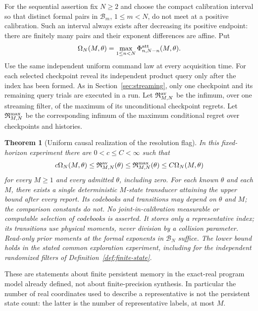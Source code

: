 \documentclass[11pt]{amsart}
\newtheorem{theorem}{Theorem}[section]
\theoremstyle{definition}\newtheorem{definition}[theorem]{Definition}
\theoremstyle{remark}\newtheorem{remark}[theorem]{Remark}
\begin{document}
For the sequential assertion fix $N\ge2$ and choose the compact
calibration interval so that distinct formal pairs in
$\mathcal B_m$, $1\le m<N$, do not meet at a positive calibration.
Such an interval always exists after decreasing its positive endpoint:
there are finitely many pairs and their exponent differences are affine.
Put
\begin{equation}\label{eq:general-stream-profile}
 \Omega_N(M,\theta)
   =\max_{1\le n<N}\Phi^{\rm att}_{n,N-n}(M,\theta).
\end{equation}
Use the same independent uniform command law at every acquisition time.
For each selected checkpoint reveal its independent product query only
after the index has been formed. As in Section~\ref{sec:streaming}, only
one checkpoint and its remaining query trials are executed in a run.
Let $\mathfrak R^{\rm av}_{M,N}$ be the infimum, over one streaming
filter, of the maximum of its unconditional checkpoint regrets. Let
$\mathfrak R^{\rm max}_{M,N}$ be the corresponding infimum of the
maximum conditional regret over checkpoints and histories.

\begin{theorem}[Uniform causal realization of the resolution flag]\label{thm:general-uniform-streaming}
In this fixed-horizon experiment there are $0<c\le C<\infty$ such that
\begin{equation}\label{eq:general-stream-law}
 c\Omega_N(M,\theta)\le\mathfrak R^{\rm av}_{M,N}(\theta)
 \le\mathfrak R^{\rm max}_{M,N}(\theta)
 \le C\Omega_N(M,\theta)
\end{equation}
for every $M\ge1$ and every admitted $\theta$, including zero. For each known $\theta$ and each $M$, there exists a
single deterministic $M$-state transducer attaining the upper bound after
every report. Its codebooks and transitions may depend on $\theta$ and
$M$; the comparison constants do not. No joint-in-calibration measurable
or computable selection of codebooks is asserted. It stores only a representative index; its transitions use
physical moments, never division by a collision parameter. Read-only
prior moments at the formal exponents in $\mathcal B_N$ suffice.
The lower bound holds in the stated common exploration experiment,
including for the independent randomized filters of
Definition~\ref{def:finite-state}.
\end{theorem}

These are statements about finite persistent memory in the exact-real
program model already defined, not about finite-precision synthesis.
In particular the number of real coordinates used to describe a
representative is not the persistent state count: the latter is the
number of representative labels, at most $M$.
\end{document}
